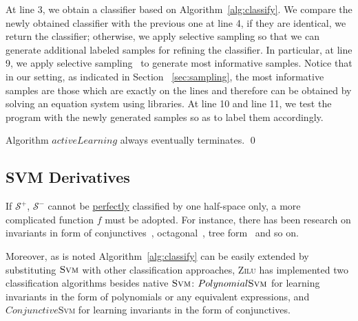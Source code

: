 At line 3, we obtain a classifier based on Algorithm~\ref{alg:classify}. 
We compare the newly obtained classifier with the previous one at line 4, if they are identical, we return the classifier; 
otherwise, we apply selective sampling so that we can generate additional labeled samples for refining the classifier. 
In particular, at line 9, we apply selective sampling~\cite{DBLP:conf/icml/SchohnC00} to generate most informative samples.
Notice that in our setting, as indicated in Section ~\ref{sec:sampling}, the most informative samples are those which are exactly on the lines 
and therefore can be obtained by solving an equation system using libraries. 
At line 10 and line 11, we test the program with the newly generated samples so as to label them accordingly.


\begin{proposition}
Algorithm $activeLearning$ always eventually terminates. \hfill \qed
\end{proposition}


\subsection{SVM Derivatives}
\label{subsec:svm:derivatives}
If $\mathcal{S}^+$, $\mathcal{S}^-$ cannot be \underline{perfectly} classified by one half-space only, 
a more complicated function $f$ must be adopted. 
For instance, there has been research on invariants in form of conjunctives~\cite{sharma2012interpolants}, 
octagonal~\cite{mine2006octagon}, tree form~\cite{krishna2015learning}\cite{garg2015learning} and so on.


Moreover, as is noted Algorithm~\ref{alg:classify} can be easily extended by substituting $\textsc{Svm}$ with other classification approaches,
\textsc{Zilu} has implemented two classification algorithms besides native $\textsc{Svm}$: 
$Polynomial \textsc{Svm}$ for learning invariants in the form of polynomials or any equivalent expressions,
and $Conjunctive$\textsc{Svm} for learning invariants in the form of conjunctives.

